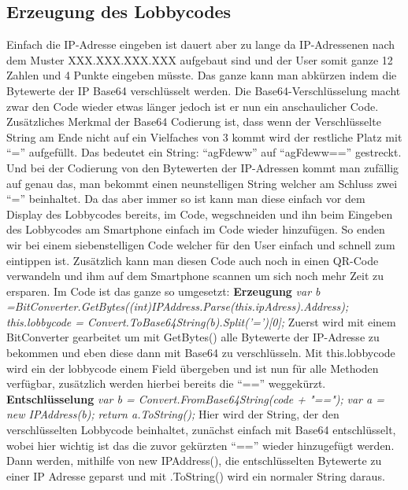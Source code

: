 \subsection{Erzeugung des Lobbycodes}
Einfach die IP-Adresse eingeben ist dauert aber zu lange da IP-Adressenen nach dem Muster XXX.XXX.XXX.XXX aufgebaut sind und der User somit ganze 12 Zahlen und 4 Punkte eingeben müsste. Das ganze kann man abkürzen indem die Bytewerte der IP Base64 verschlüsselt werden. Die Base64-Verschlüsselung macht zwar den Code wieder etwas länger jedoch ist er nun ein anschaulicher Code. Zusätzliches Merkmal der Base64 Codierung ist, dass wenn der Verschlüsselte String am Ende nicht auf ein Vielfaches von 3 kommt wird der restliche Platz mit “=” aufgefüllt. Das bedeutet ein String: “agFdeww” auf “agFdeww==” gestreckt. Und bei der Codierung von den Bytewerten der IP-Adressen kommt man zufällig auf genau das, man bekommt einen neunstelligen String welcher am Schluss zwei “=” beinhaltet. Da das aber immer so ist kann man diese einfach vor dem Display des Lobbycodes bereits, im Code, wegschneiden und ihn beim Eingeben des Lobbycodes am Smartphone einfach im Code wieder hinzufügen. So enden wir bei einem siebenstelligen Code welcher für den User einfach und schnell zum eintippen ist. Zusätzlich kann man diesen Code auch noch in einen QR-Code verwandeln und ihm auf dem Smartphone scannen um sich noch mehr Zeit zu ersparen. Im Code ist das ganze so umgesetzt: \newline 
\textbf{Erzeugung}
\newline  \newline
\textit{var b =BitConverter.GetBytes((int)IPAddress.Parse(this.ipAdress).Address);}
\newline
\textit{this.lobbycode = Convert.ToBase64String(b).Split('=')[0];}
\newline \newline
Zuerst wird mit einem BitConverter gearbeitet um mit GetBytes() alle Bytewerte der IP-Adresse zu bekommen und eben diese dann mit Base64 zu verschlüsseln. Mit this.lobbycode wird ein der lobbycode einem Field übergeben und ist nun für alle Methoden verfügbar, zusätzlich werden hierbei bereits die “==” weggekürzt.
\newline \newline
\textbf{Entschlüsselung}
\newline \newline
\textit{var b = Convert.FromBase64String(code + "==");}
\newline
\textit{var a = new IPAddress(b);}
\newline
\textit{return a.ToString();}
\newline \newline
Hier wird der String, der den verschlüsselten Lobbycode beinhaltet, zunächst einfach mit Base64 entschlüsselt, wobei hier wichtig ist das die zuvor gekürzten “==” wieder hinzugefügt werden. Dann werden, mithilfe von new IPAddress(), die entschlüsselten Bytewerte zu einer IP Adresse geparst und mit .ToString() wird ein normaler String daraus.
